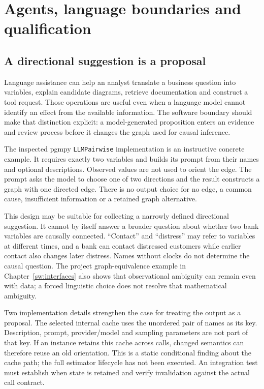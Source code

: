 \chapter{Agents, language boundaries and qualification}
\label{sw:agents}

\section{A directional suggestion is a proposal}

Language assistance can help an analyst translate a business question into
variables, explain candidate diagrams, retrieve documentation and construct a
tool request. Those operations are useful even when a language model cannot
identify an effect from the available information. The software boundary should
make that distinction explicit: a model-generated proposition enters an evidence
and review process before it changes the graph used for causal inference.

The inspected pgmpy \texttt{LLMPairwise} implementation is an instructive
concrete example. It requires exactly two variables and builds its prompt from
their names and optional descriptions. Observed values are not used to orient
the edge. The prompt asks the model to choose one of two directions and the
result constructs a graph with one directed edge. There is no output choice
for no edge, a common cause, insufficient information or a retained graph
alternative.\cite{pgmpy}

This design may be suitable for collecting a narrowly defined directional
suggestion. It cannot by itself answer a broader question about whether two
bank variables are causally connected. ``Contact'' and ``distress'' may refer
to variables at different times, and a bank can contact distressed customers
while earlier contact also changes later distress. Names without clocks do
not determine the causal question. The project graph-equivalence example in
Chapter~\ref{sw:interfaces} also shows that observational ambiguity can remain
even with data; a forced linguistic choice does not resolve that mathematical
ambiguity.

Two implementation details strengthen the case for treating the output as a
proposal. The selected internal cache uses the unordered pair of names as its
key. Description, prompt, provider/model and sampling parameters are not part
of that key. If an instance retains this cache across calls, changed semantics
can therefore reuse an old orientation. This is a static conditional finding
about the cache path; the full estimator lifecycle has not been executed.
An integration test must establish when state is retained and verify
invalidation against the actual call contract.\cite{pgmpy}

